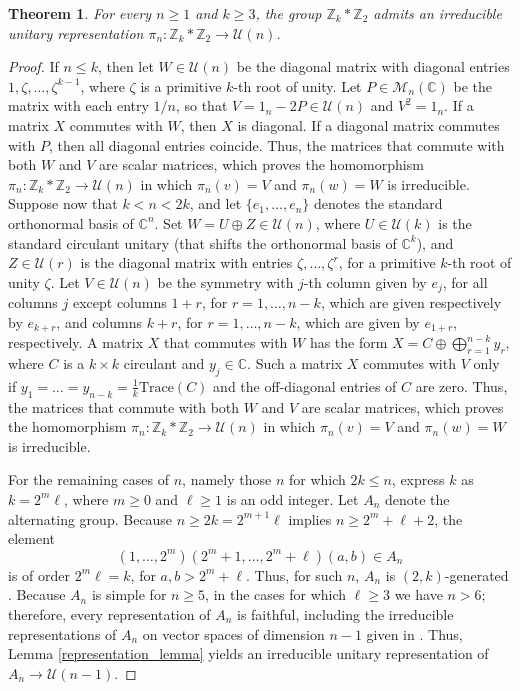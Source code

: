 \documentclass{amsart}
\newtheorem{theorem}{Theorem}[section]
\theoremstyle{definition}
\theoremstyle{remark}
\newcommand{\M}{\mathcal{M}}
\numberwithin{equation}{section}
\begin{document}
\begin{theorem}\label{irr repn}
For every $n\geq1$ and $k\geq3$, the group $\mathbb Z_k*\mathbb Z_2$ admits an irreducible unitary representation
$\pi_n:\mathbb Z_k*\mathbb Z_2\rightarrow \mathcal U(n)$.
\end{theorem}

\begin{proof} If $n\leq k$, then let $W\in\mathcal U(n)$ be the diagonal matrix with diagonal entries $1,\zeta,\dots,\zeta^{k-1}$, where
$\zeta$ is a primitive $k$-th root of unity. Let $P\in\M_n(\mathbb C)$ be the matrix with each entry $1/n$, so that 
$V=1_n-2P\in\mathcal U(n)$ and $V^2=1_n$. If a matrix $X$ commutes with $W$, then $X$ is diagonal. If a diagonal matrix
commutes with $P$,
then all diagonal entries coincide. Thus, the matrices that commute with both $W$ and $V$ are scalar matrices, which proves the
homomorphism $\pi_n:\mathbb Z_k*\mathbb Z_2\rightarrow \mathcal U(n)$ in which $\pi_n(v)=V$ and $\pi_n(w)=W$ is
irreducible.
Suppose now that $k<n< 2k$, and let
$\{e_1,\dots,e_n\}$ denotes the standard orthonormal basis of $\mathbb C^n$. Set 
$W=U\oplus Z\in\mathcal U(n)$, where $U\in\mathcal U(k)$ is the standard circulant unitary (that shifts
the orthonormal basis of $\mathbb C^k$), and $Z\in\mathcal U(r)$ is the diagonal matrix with entries $\zeta,\dots,\zeta^r$, for a primitive
$k$-th root of unity $\zeta$. Let
$V\in\mathcal U(n)$ be the symmetry with $j$-th column given by $e_j$,
for all columns $j$ except columns $1+r$, for $r=1,\dots,n-k$, which are given respectively by $e_{k+r}$, 
and columns $k+r$, for $r=1,\dots,n-k$, which are given by $e_{1+r}$, respectively.
A matrix $X$ that commutes with $W$ has the form $X=C\oplus \bigoplus_{r=1}^{n-k} y_r$, 
where $C$ is a $k\times k$ circulant and $y_j\in\mathbb C$. Such
a matrix $X$ commutes with $V$ only if $y_1=\dots=y_{n-k}=\frac{1}{k}\mbox{Trace}(C)$ and the off-diagonal entries of $C$ are zero. 
Thus, the matrices that commute with both $W$ and $V$ are scalar matrices, which proves the
homomorphism $\pi_n:\mathbb Z_k*\mathbb Z_2\rightarrow \mathcal U(n)$ in which $\pi_n(v)=V$ and $\pi_n(w)=W$ is
irreducible. 

For the remaining cases of $n$, namely those $n$ for which $2k\leq n$, express $k$ as
$k=2^m\ell $, where $m\geq 0$ and $\ell\geq 1$ is an odd integer. Let $A_n$ denote the alternating group.
Because $n\geq 2k=2^{m+1}\ell$ implies $n\geq 2^m+\ell+2$,  
the element
\[
(1,\dots, 2^m)(2^m+1,\dots, 2^m+\ell)(a,b)\in A_n
\]
is of order $2^m\ell=k$, for $a,b> 2^m+\ell$. Thus, for such $n$, 
$A_n$ is $(2,k)$-generated \cite{miller1928}. Because $A_n$ is simple for $n\geq 5$,
in the cases for which $\ell\geq 3$ we have $n>6$; therefore,
every representation of $A_n$ is faithful, including the irreducible representations
of $A_n$ on vector spaces of dimension $n-1$ given in \cite{fulton-harris-book}. Thus,
Lemma \ref{representation_lemma} yields an irreducible unitary representation of $A_n\rightarrow\mathcal U(n-1)$.


\end{proof}
\end{document}
